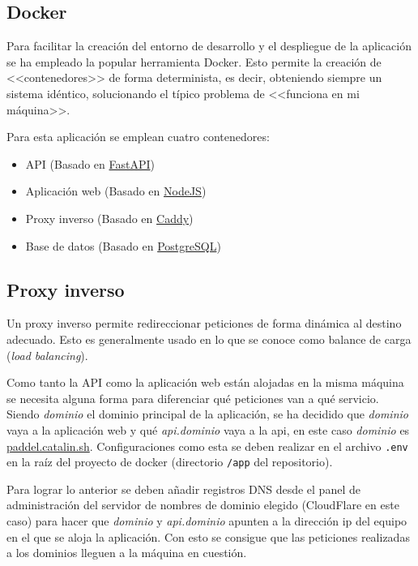 \subsection{Docker}

Para facilitar la creación del entorno de desarrollo y el despliegue de la
aplicación se ha empleado la popular herramienta Docker. Esto permite la
creación de <<contenedores>> de forma determinista, es decir, obteniendo siempre
un sistema idéntico, solucionando el típico problema de <<funciona en mi
máquina>>.

Para esta aplicación se emplean cuatro contenedores:

\begin{itemize}
    \item API (Basado en \href{https://fastapi.tiangolo.com/}{FastAPI})
    \item Aplicación web (Basado en \href{https://nodejs.org/en}{NodeJS})
    \item Proxy inverso (Basado en \href{https://caddyserver.com/}{Caddy})
    \item Base de datos (Basado en \href{https://www.postgresql.org/}{PostgreSQL})
\end{itemize}

\subsection{Proxy inverso}

Un proxy inverso permite redireccionar peticiones de forma dinámica al destino
adecuado. Esto es generalmente usado en lo que se conoce como balance de carga
(\textit{load balancing}).

Como tanto la API como la aplicación web están alojadas en la misma máquina se
necesita alguna forma para diferenciar qué peticiones van a qué servicio. Siendo
\textit{dominio} el dominio principal de la aplicación, se ha decidido que
\textit{dominio} vaya a la aplicación web y qué \textit{api.dominio} vaya a la
api, en este caso \textit{dominio} es
\href{https://paddel.catalin.sh}{paddel.catalin.sh}. Configuraciones como esta
se deben realizar en el archivo \texttt{.env} en la raíz del proyecto de docker
(directorio \texttt{/app} del repositorio).

Para lograr lo anterior se deben añadir registros DNS desde el panel de
administración del servidor de nombres de dominio elegido (CloudFlare en este
caso) para hacer que \textit{dominio} y \textit{api.dominio} apunten a la
dirección ip del equipo en el que se aloja la aplicación. Con esto se consigue
que las peticiones realizadas a los dominios lleguen a la máquina en cuestión.

